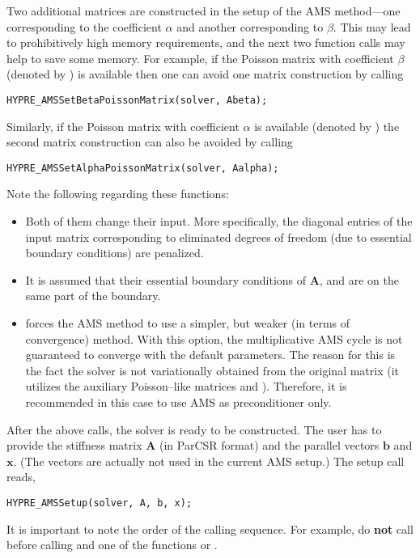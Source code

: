 Two additional matrices are constructed in the setup of the
AMS method---one corresponding to the coefficient $\alpha$
and another corresponding to $\beta$.
This may  lead to prohibitively high memory requirements, and
the next two function calls may help to save some memory.
For example, if the Poisson matrix with coefficient $\beta$
(denoted by ) is
available then one can avoid one matrix construction by calling
\begin{display}\begin{verbatim}
HYPRE_AMSSetBetaPoissonMatrix(solver, Abeta);
\end{verbatim}\end{display}
Similarly, if the Poisson matrix with coefficient $\alpha$ is available
(denoted by )
the second matrix construction can also be avoided by calling
\begin{display}\begin{verbatim}
HYPRE_AMSSetAlphaPoissonMatrix(solver, Aalpha);
\end{verbatim}\end{display}
Note the following regarding these functions:
\begin{itemize}
\item Both of them change their input. More specifically,
the diagonal entries of the input matrix corresponding to eliminated
degrees of freedom (due to essential boundary conditions)
are penalized.
\item It is assumed that their essential boundary conditions of
${\mathbf A}$,  and  are on the same
part of the boundary.
\item {} forces the
AMS method to use a simpler, but weaker (in terms of convergence) method.
With this option, the multiplicative AMS cycle
is not guaranteed to converge with the
default parameters. The reason for this is the fact the solver is not
variationally obtained from the original matrix (it utilizes
the auxiliary Poisson--like matrices  and ).
Therefore, it is recommended in this case to use AMS as preconditioner
only.
\end{itemize}

After the above calls, the solver is ready to be constructed.
The user has to provide the stiffness matrix ${\mathbf A}$ (in ParCSR format) and
the \hypre{} parallel vectors ${\mathbf b}$ and ${\mathbf x}$. (The vectors
are actually not used in the current AMS setup.) The setup call reads,
\begin{display}\begin{verbatim}
HYPRE_AMSSetup(solver, A, b, x);
\end{verbatim}\end{display}
It is important to note the order of the calling sequence. For example, do {\bf not}
call  before calling
and one of the functions
 or .

